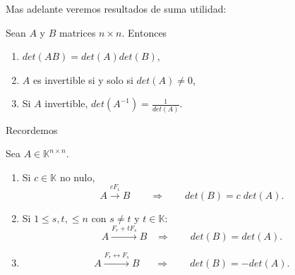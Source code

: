 \documentclass{article}
\theoremstyle{definition}
\theoremstyle{definition}
\theoremstyle{remark}
\begin{document}
Mas adelante veremos resultados de suma utilidad: 
\begin{teo}Sean $A$ y $B$ matrices $n \times n$. Entonces \begin{enumerate}[label=\arabic*.]
  \item $det(AB)=det(A)det(B)$,
  \item $A$ es invertible si y solo si $det(A) \neq 0$, 
  \item Si $A$ invertible, $det(A^{-1})=\frac{1}{det(A)}$.
\end{enumerate}
\end{teo}
Recordemos
\begin{teo} Sea $A \in \mathbb{K}^{n \times n}$. \begin{enumerate}[label=\textcolor{azulp2}{E\arabic*.}]
  \item Si $  c \in \mathbb{K}$ no nulo, \[
      A \xrightarrow{cF_i} B \quad \quad \Rightarrow \quad \quad det(B)=c\;det(A).
    \]
  \item Si $ 1 \leq s,t, \leq n$ con $ s \neq t$ y $t \in \mathbb{K}$: \[
      A \xrightarrow{F_r+tF_s} B \; \; \; \Rightarrow \quad \quad det(B)=det(A).
    \]
\item \[
    A \xrightarrow{F_r \leftrightarrow F_s} B  \;\;\quad \Rightarrow \quad \quad det(B) = -det(A).
  \]
\end{enumerate}
\end{teo}
\end{document}

